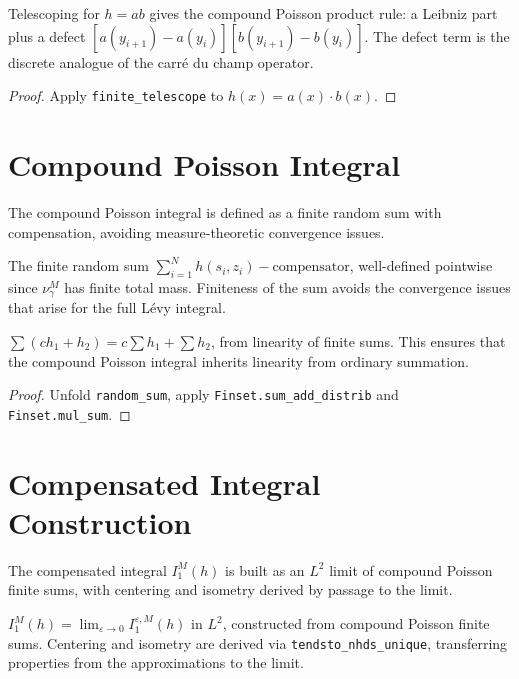 \begin{theorem}\label{thm:product_telescope}
\leanok
{}
Telescoping for $h = ab$ gives the compound Poisson product rule: a Leibniz part
plus a defect $[a(y_{i+1}) - a(y_i)][b(y_{i+1}) - b(y_i)]$.
The defect term is the discrete analogue of the carré du champ operator.
\end{theorem}
\begin{proof}\leanok Apply \texttt{finite\_telescope} to $h(x) = a(x) \cdot b(x)$.\end{proof}

\section{Compound Poisson Integral}

The compound Poisson integral is defined as a finite random sum with compensation, avoiding measure-theoretic convergence issues.

\begin{defn}\label{def:cpi}
\leanok
The finite random sum $\sum_{i=1}^{N} h(s_i, z_i) - \mathrm{compensator}$,
well-defined pointwise since $\nu_\gamma^M$ has finite total mass.
Finiteness of the sum avoids the convergence issues that arise for the full Lévy integral.
\end{defn}

\begin{theorem}\label{thm:random_sum_linear}
\leanok
{}
$\sum(ch_1 + h_2) = c\sum h_1 + \sum h_2$, from linearity of finite sums.
This ensures that the compound Poisson integral inherits linearity from ordinary summation.
\end{theorem}
\begin{proof}\leanok Unfold \texttt{random\_sum}, apply \texttt{Finset.sum\_add\_distrib} and \texttt{Finset.mul\_sum}.\end{proof}

\section{Compensated Integral Construction}

The compensated integral $I_1^M(h)$ is built as an $L^2$ limit of compound Poisson finite sums, with centering and isometry derived by passage to the limit.

\begin{defn}\label{def:cci}
\leanok
{}
$I_1^M(h) = \lim_{\varepsilon \to 0} I_1^{\varepsilon,M}(h)$ in $L^2$,
constructed from compound Poisson finite sums. Centering and isometry are
derived via \texttt{tendsto\_nhds\_unique}, transferring properties from the approximations to the limit.
\end{defn}

